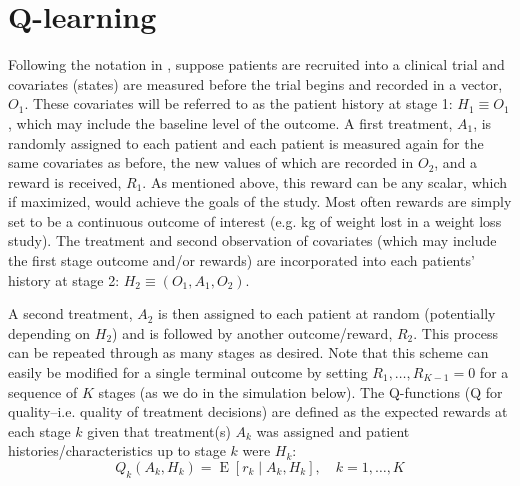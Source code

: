 \documentclass[12pt]{article}
\begin{document}


\section{Q-learning} %
\label{sec:q_learning}

Following the notation in \textcite{dtr-book}, suppose patients are recruited into a clinical trial and covariates (states) are measured before the trial begins and recorded in a vector, $O_{1}$. These covariates will be referred to as the patient history at stage 1: $H_{1} \equiv O_{1}$, which may include the baseline level of the outcome. A first treatment, $A_{1}$, is randomly assigned to each patient and each patient is measured again for the same covariates as before, the new values of which are recorded in $O_{2}$, and a reward is received, $R_{1}$. As mentioned above, this reward can be any scalar, which if maximized, would achieve the goals of the study. Most often rewards are simply set to be a continuous outcome of interest (e.g. kg of weight lost in a weight loss study). The treatment and second observation of covariates (which may include the first stage outcome and/or rewards) are incorporated into each patients' history at stage 2: $H_{2} \equiv (O_{1}, A_{1}, O_{2})$. 

A second treatment, $A_{2}$ is then assigned to each patient at random (potentially depending on $H_{2}$) and is followed by another outcome/reward, $R_{2}$. This process can be repeated through as many stages as desired. Note that this scheme can easily be modified for a single terminal outcome by setting $R_{1}, \ldots, R_{K-1} = 0$ for a sequence of $K$ stages (as we do in the simulation below). The Q-functions (Q for quality--i.e. quality of treatment decisions) are defined as the expected rewards at each stage $k$ given that treatment(s) $A_{k}$ was assigned and patient histories/characteristics up to stage $k$ were $H_{k}$:
\begin{equation}
   Q_{k}(A_{k}, H_{k})  = \operatorname{E}[r_{k} \mid A_{k}, H_{k}], \quad k = 1, \ldots, K
\end{equation}

%
%
%
\end{document}
